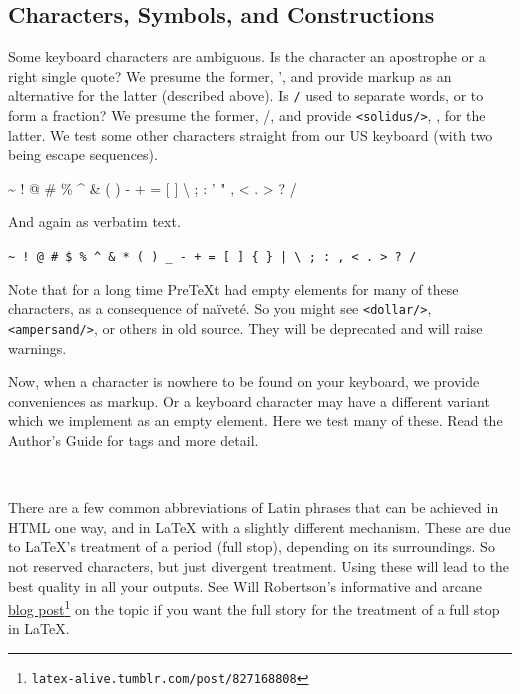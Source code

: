\documentclass{sn-jnl}
\theoremstyle{thmstyleone}%
\theoremstyle{thmstyletwo}%
\theoremstyle{thmstylethree}%
\newcommand{\mono}[1]{\texttt{#1}}
\newcommand{\swungdash}{\raisebox{-2.25ex}{\scalebox{2}{\~{}}}}
\numberwithin{equation}{section}
\begin{document}
\subsection{Characters, Symbols, and Constructions}\label{section-text-paragraphs-8}%
Some keyboard characters are ambiguous.  Is the character \mono{\textquotesingle{}} an apostrophe or a right single quote?  We presume the former, ', and provide markup as an alternative for the latter (described above).  Is \mono{/} used to separate words, or to form a fraction?  We presume the former, \slash{}, and provide \mono{<solidus/>}, \textfractionsolidus{}, for the latter.  We test some other characters straight from our US keyboard (with two being escape sequences).%
\par
\textasciitilde{} \textasciigrave{} ! @ \# \textdollar{} \% \textasciicircum{} \& \textasteriskcentered{} ( ) \textunderscore{} - + = [ ] \textbraceleft{} \textbraceright{} \textbar{} \textbackslash{} ; : ' " , \textless{} . \textgreater{} ? \slash{}%
\par
And again  as verbatim text.%
\par
\mono{\textasciitilde{} \textasciigrave{} ! @ \# \$ \% \textasciicircum{} \& * ( ) \_ - + = [ ] \{ \} | \textbackslash{} ; : \textquotesingle{} \textquotedbl{} , < . > ? /}%
\par
Note that for a long time PreTeXt had empty elements for many of these characters, as a consequence of naïveté.  So you might see \mono{<dollar/>}, \mono{<ampersand/>}, or others in old source.  They will be deprecated and will raise warnings.%
\par
Now, when a character is nowhere to be found on your keyboard, we provide conveniences as markup.  Or a keyboard character may have a different variant which we implement as an empty element.  Here we test many of these.  Read the Author's Guide for tags and more detail.%
\par
\textcopyright{}~~ \textcircledP{}~~ \textcopyleft{}~~ \textregistered{}~~ \texttrademark{}~~ \textservicemark{}~~ \textellipsis{}~~ \textperiodcentered{}~~ \swungdash{}~~ \textperthousand{}~~ \textpilcrow{}~~ \textsection{}~~ \textminus{}~~ \texttimes{}~~ \textfractionsolidus{}~~ \textdiv{}~~ \textpm{}%
\par
There are a few  common abbreviations of Latin phrases that can be achieved in HTML one way, and in \LaTeX{} with a slightly different mechanism.  These are due to \LaTeX{}'s treatment of a period (full stop), depending on its surroundings.  So not reserved characters, but just divergent treatment.  Using these will lead to the best quality in all your outputs.  See Will Robertson's informative and arcane \href{http://latex-alive.tumblr.com/post/827168808/correct-punctuation-spaces}{blog post}\footnote{\nolinkurl{latex-alive.tumblr.com/post/827168808}\label{section-text-paragraphs-8-9-4}} on the topic if you want the full story for the treatment of a full stop in \LaTeX{}.%
\end{document}
